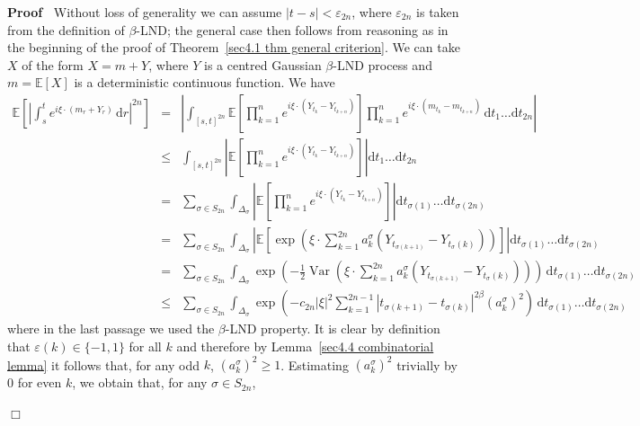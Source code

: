 \documentclass[10pt]{article}
\newcommand{\mathd}{\mathrm{d}}
\newcommand{\tmop}[1]{\ensuremath{\operatorname{#1}}}
\newenvironment{proof}{\noindent\textbf{Proof\ }}{\hspace*{\fill}$\Box$\medskip}
\begin{document}
\begin{proof}
  Without loss of generality we can assume $| t - s | < \varepsilon_{2 n}$,
  where $\varepsilon_{2 n}$ is taken from the definition of
  $\beta$\mbox{-}LND; the general case then follows from reasoning as in the
  beginning of the proof of Theorem~\ref{sec4.1 thm general criterion}. We can
  take $X$ of the form $X = m + Y$, where $Y$ is a centred Gaussian
  $\beta$\mbox{-}LND process and $m =\mathbb{E} [X]$ is a deterministic
  continuous function. We have
  \begin{eqnarray*}
    \mathbb{E} \left[ \left| \int_s^t e^{i \xi \cdot (m_r + Y_r)} \, \mathd r
    \right|^{2 n} \right] & = & \left| \int_{[s, t]^{2 n}} \mathbb{E} \left[
    \prod_{k = 1}^n e^{i \xi \cdot (Y_{t_k} - Y_{t_{k + n}})} \right] \prod_{k
    = 1}^n e^{i \xi \cdot (m_{t_k} - m_{t_{k + n}})} \, \mathd t_1 \ldots
    \mathd t_{2 n} \right|\\
    & \leqslant & \int_{[s, t]^{2 n}} \left| \mathbb{E} \left[ \prod_{k =
    1}^n e^{i \xi \cdot (Y_{t_k} - Y_{t_{k + n}})} \right] \right| \mathd t_1
    \ldots \mathd t_{2 n}\\
    & = & \sum_{\sigma \in S_{2 n}} \int_{\Delta_{\sigma}} \left| \mathbb{E}
    \left[ \prod_{k = 1}^n e^{i \xi \cdot (Y_{t_k} - Y_{t_{k + n}})} \right]
    \right| \mathd t_{\sigma (1)} \ldots \mathd t_{\sigma (2 n)}\\
    & = & \sum_{\sigma \in S_{2 n}} \int_{\Delta_{\sigma}} \left| \mathbb{E}
    \left[ \exp \left( \xi \cdot \sum_{k = 1}^{2 n} a_k^{\sigma} (Y_{t_{\sigma
    (k + 1)}} - Y_{t_{\sigma} (k)}) \right) \right] \right| \mathd t_{\sigma
    (1)} \ldots \mathd t_{\sigma (2 n)}\\
    & = & \sum_{\sigma \in S_{2 n}} \int_{\Delta_{\sigma}} \exp \left( -
    \frac{1}{2} \tmop{Var} \left( \xi \cdot \sum_{k = 1}^{2 n} a_k^{\sigma}
    (Y_{t_{\sigma (k + 1)}} - Y_{t_{\sigma} (k)}) \right) \right) \, \mathd
    t_{\sigma (1)} \ldots \mathd t_{\sigma (2 n)}\\
    & \leqslant & \sum_{\sigma \in S_{2 n}} \int_{\Delta_{\sigma}} \exp
    \left( - c_{2 n} | \xi |^2  \sum_{k = 1}^{2 n - 1} | t_{\sigma (k + 1)} -
    t_{\sigma (k)} |^{2 \beta} (a_k^{\sigma})^2 \right) \, \mathd t_{\sigma
    (1)} \ldots \mathd t_{\sigma (2 n)}
  \end{eqnarray*}
  where in the last passage we used the $\beta$\mbox{-}LND property. It is
  clear by definition that $\varepsilon (k) \in \{ - 1, 1 \}$ for all $k$ and
  therefore by Lemma~\ref{sec4.4 combinatorial lemma} it follows that, for any
  odd $k$, $(a_k^{\sigma})^2 \geqslant 1$. Estimating $(a_k^{\sigma})^2$
  trivially by $0$ for even $k$, we obtain that, for any $\sigma \in S_{2 n}$,
  

\end{proof}
\end{document}

